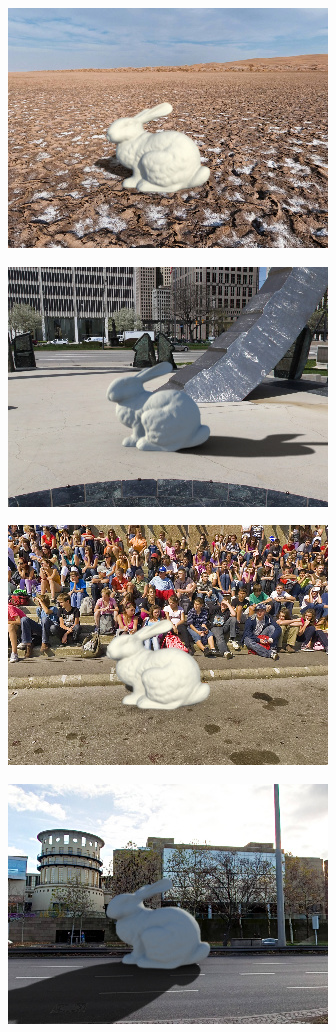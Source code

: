 \begin{multicols}{3}
\includegraphics[width=\mywidth]{pano_aqfnsmhtrqbblm.jpg}

\includegraphics[width=\mywidth]{pano_anfgcccjlbzzhv.jpg}

\includegraphics[width=\mywidth]{pano_aotlotniqjfhrm.jpg}

\includegraphics[width=\mywidth]{pano_aptzailmnatdvm.jpg}


\end{multicols}
